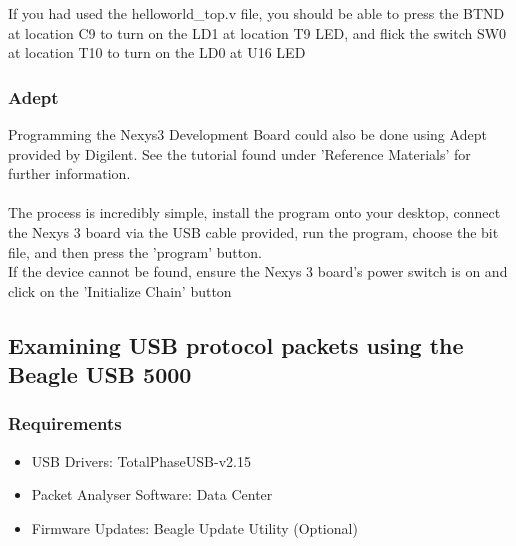 \documentclass[10pt,a4paper]{article}
\begin{document}
If you had used the helloworld\_top.v file, you should be able to press the BTND at location C9 to turn on the LD1 at location T9 LED, and flick the switch SW0 at location T10 to turn on the LD0 at U16 LED

\subsubsection{Adept}
Programming the Nexys3 Development Board could also be done using Adept provided by Digilent. See the tutorial found under 'Reference Materials' for further information.\\ \\
The process is incredibly simple, install the program onto your desktop, connect the Nexys 3 board via the USB cable provided, run the program, choose the bit file, and then press the 'program' button. \\
If the device cannot be found, ensure the Nexys 3 board's power switch is on and click on the 'Initialize Chain' button 

\subsection{Examining USB protocol packets using the Beagle USB 5000}
\subsubsection{Requirements}
\begin{itemize}
	\item USB Drivers: TotalPhaseUSB-v2.15
	\item Packet Analyser Software: Data Center 
	\item Firmware Updates: Beagle Update Utility (Optional)
\end{itemize}
\end{document}
